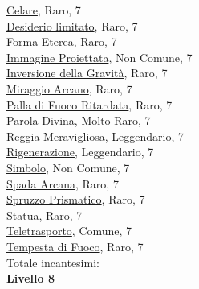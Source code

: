 \begin{multicols}{3}
{{\hyperlink{Celare}{Celare}, Raro, 7\\
\hyperlink{Desiderio limitato}{Desiderio limitato}, Raro, 7\\
\hyperlink{Forma Eterea}{Forma Eterea}, Raro, 7\\
\hyperlink{Immagine Proiettata}{Immagine Proiettata}, Non Comune, 7\\
\hyperlink{Inversione della Gravità}{Inversione della Gravità}, Raro, 7\\
\hyperlink{Miraggio Arcano}{Miraggio Arcano}, Raro, 7\\
\hyperlink{Palla di Fuoco Ritardata}{Palla di Fuoco Ritardata}, Raro, 7\\
\hyperlink{Parola Divina}{Parola Divina}, Molto Raro, 7\\
\hyperlink{Reggia Meravigliosa}{Reggia Meravigliosa}, Leggendario, 7\\
\hyperlink{Rigenerazione}{Rigenerazione}, Leggendario, 7\\
\hyperlink{Simbolo}{Simbolo}, Non Comune, 7\\
\hyperlink{Spada Arcana}{Spada Arcana}, Raro, 7\\
\hyperlink{Spruzzo Prismatico}{Spruzzo Prismatico}, Raro, 7\\
\hyperlink{Statua}{Statua}, Raro, 7\\
\hyperlink{Teletrasporto}{Teletrasporto}, Comune, 7\\
\hyperlink{Tempesta di Fuoco}{Tempesta di Fuoco}, Raro, 7\\

\medskip Totale incantesimi: \theinclvsette\\

\textbf{Livello 8}

}}
\end{multicols}
